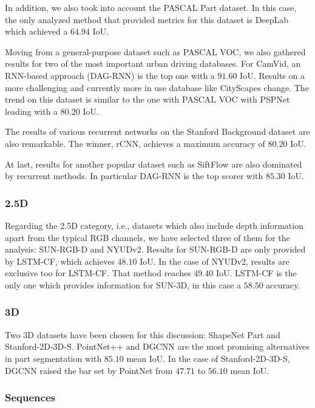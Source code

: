 In addition, we also took into account the PASCAL Part dataset. In this case, the only analyzed method that provided metrics for this dataset is DeepLab which achieved a $64.94$ \acs{IoU}.

Moving from a general-purpose dataset such as PASCAL \acs{VOC}, we also gathered results for two of the most important urban driving databases. For CamVid, an \acs{RNN}-based approach (DAG-\acs{RNN}) is the top one with a $91.60$ \acs{IoU}. Results on a more challenging and currently more in use database like CityScapes change. The trend on this dataset is similar to the one with PASCAL \acs{VOC} with \acs{PSPNet} leading with a $80.20$ \acs{IoU}.

The results of various recurrent networks on the Stanford Background dataset are also remarkable. The winner, r\acs{CNN}, achieves a maximum accuracy of $80.20$ \acs{IoU}.

At last, results for another popular dataset such as SiftFlow are also dominated by recurrent methods. In particular DAG-\acs{RNN} is the top scorer with $85.30$ \acs{IoU}.

\subsubsection{\acs{2.5D}}

Regarding the \acs{2.5D} category, i.e., datasets which also include depth information apart from the typical \acs{RGB} channels, we have selected three of them for the analysis: SUN-\acs{RGB-D} and NYUDv2. Results for SUN-\acs{RGB-D} are only provided by \acs{LSTM-CF}, which achieves $48.10$ \acs{IoU}. In the case of NYUDv2, results are exclusive too for \acs{LSTM-CF}. That method reaches $49.40$ \acs{IoU}. \acs{LSTM-CF} is the only one which provides information for SUN-3D, in this case a $58.50$ accuracy.

\subsubsection{\acs{3D}}

Two \acs{3D} datasets have been chosen for this discussion: ShapeNet Part and Stanford-\acs{2D}-\acs{3D}-S. PointNet++ and \ac{DGCNN} are the most promising alternatives in part segmentation with $85.10$ mean \ac{IoU}. In the case of Stanford-\acs{2D}-\acs{3D}-S, \ac{DGCNN} raised the bar set by PointNet from $47.71$ to $56.10$ mean \ac{IoU}.

\subsubsection{Sequences}

